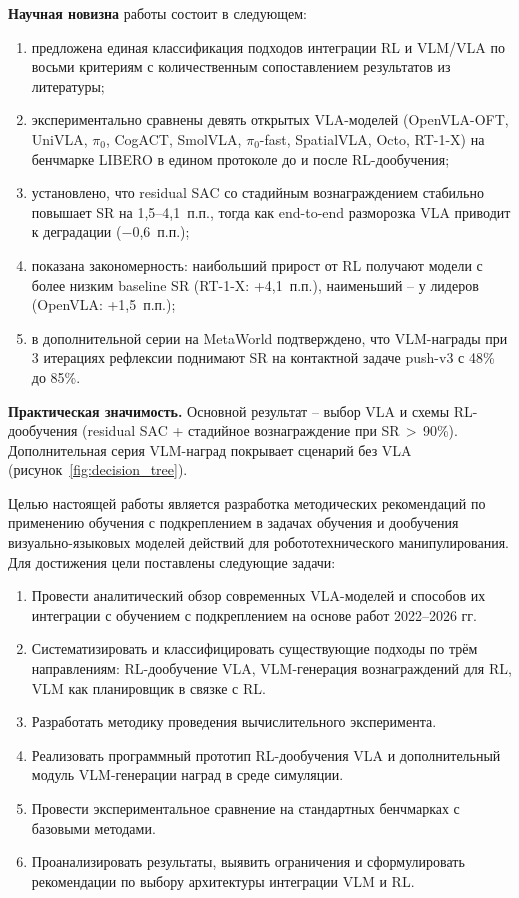     \textbf{Научная новизна} работы состоит в следующем:
    \begin{enumerate}
        \item предложена единая классификация подходов интеграции RL и VLM/VLA по восьми критериям с количественным сопоставлением результатов из литературы;
        \item экспериментально сравнены девять открытых VLA-моделей (OpenVLA-OFT, UniVLA, $\pi_0$, CogACT, SmolVLA, $\pi_0$-fast, SpatialVLA, Octo, RT-1-X) на бенчмарке LIBERO в едином протоколе до и после RL-дообучения;
        \item установлено, что residual SAC со стадийным вознаграждением стабильно повышает SR на 1,5--4,1~п.п., тогда как end-to-end разморозка VLA приводит к деградации ($-$0,6~п.п.);
        \item показана закономерность: наибольший прирост от RL получают модели с более низким baseline SR (RT-1-X: +4,1~п.п.), наименьший -- у лидеров (OpenVLA: +1,5~п.п.);
        \item в дополнительной серии на MetaWorld подтверждено, что VLM-награды при 3 итерациях рефлексии поднимают SR на контактной задаче push-v3 с 48\% до 85\%.
    \end{enumerate}

    \textbf{Практическая значимость.} Основной результат -- выбор VLA и схемы RL-дообучения (residual SAC + стадийное вознаграждение при SR\,$>$\,90\%). Дополнительная серия VLM-наград покрывает сценарий без VLA (рисунок~\ref{fig:decision_tree}).

    Целью настоящей работы является разработка методических рекомендаций по применению обучения с подкреплением в задачах обучения и дообучения визуально-языковых моделей действий для робототехнического манипулирования. Для достижения цели поставлены следующие задачи:

\begin{enumerate}
    \item Провести аналитический обзор современных VLA-моделей и способов их интеграции с обучением с подкреплением на основе работ 2022--2026 гг.
    \item Систематизировать и классифицировать существующие подходы по трём направлениям: RL-дообучение VLA, VLM-генерация вознаграждений для RL, VLM как планировщик в связке с RL.
    \item Разработать методику проведения вычислительного эксперимента.
    \item Реализовать программный прототип RL-дообучения VLA и дополнительный модуль VLM-генерации наград в среде симуляции.
    \item Провести экспериментальное сравнение на стандартных бенчмарках с базовыми методами.
    \item Проанализировать результаты, выявить ограничения и сформулировать рекомендации по выбору архитектуры интеграции VLM и RL.
\end{enumerate}

